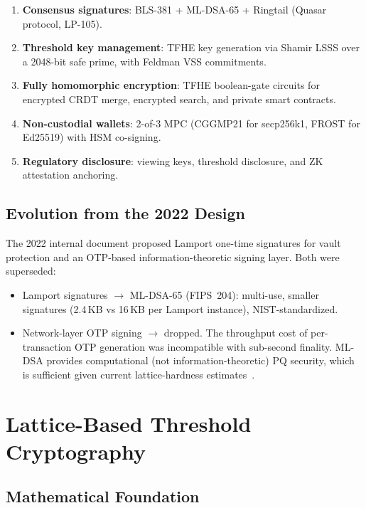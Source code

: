 \documentclass[11pt,a4paper]{article}
\begin{document}
\begin{enumerate}[nosep]
  \item \textbf{Consensus signatures}: BLS-381 + ML-DSA-65 + Ringtail
        (Quasar protocol, LP-105).
  \item \textbf{Threshold key management}: TFHE key generation via
        Shamir LSSS over a 2048-bit safe prime, with Feldman VSS
        commitments.
  \item \textbf{Fully homomorphic encryption}: TFHE boolean-gate
        circuits for encrypted CRDT merge, encrypted search, and
        private smart contracts.
  \item \textbf{Non-custodial wallets}: 2-of-3 MPC (CGGMP21 for
        secp256k1, FROST for Ed25519) with HSM co-signing.
  \item \textbf{Regulatory disclosure}: viewing keys, threshold
        disclosure, and ZK attestation anchoring.
\end{enumerate}

\subsection{Evolution from the 2022 Design}

The 2022 internal document proposed Lamport one-time signatures for
vault protection and an OTP-based information-theoretic signing layer.
Both were superseded:

\begin{itemize}[nosep]
  \item Lamport signatures $\rightarrow$ ML-DSA-65 (FIPS~204): multi-use,
        smaller signatures (2.4\,KB vs 16\,KB per Lamport instance),
        NIST-standardized.
  \item Network-layer OTP signing $\rightarrow$ dropped. The throughput
        cost of per-transaction OTP generation was incompatible with
        sub-second finality. ML-DSA provides computational (not
        information-theoretic) PQ security, which is sufficient given
        current lattice-hardness estimates~\cite{nist-pqc-report}.
\end{itemize}

\section{Lattice-Based Threshold Cryptography}

\subsection{Mathematical Foundation}
\end{document}
